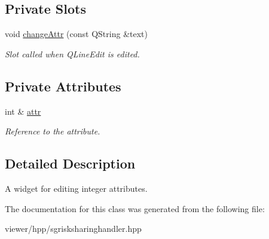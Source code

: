 \subsection*{Private Slots}
\begin{DoxyCompactItemize}
\item 
\mbox{\label{classSGIntAttrEdit_a2a8918c9b08a451d63779566f102391b}} 
void \hyperlink{classSGIntAttrEdit_a2a8918c9b08a451d63779566f102391b}{change\+Attr} (const Q\+String \&text)
\begin{DoxyCompactList}\small\item\em Slot called when Q\+Line\+Edit is edited. \end{DoxyCompactList}\end{DoxyCompactItemize}
\subsection*{Private Attributes}
\begin{DoxyCompactItemize}
\item 
\mbox{\label{classSGIntAttrEdit_ac7a5de9b8735b5f0d1f39759c833fd4f}} 
int \& \hyperlink{classSGIntAttrEdit_ac7a5de9b8735b5f0d1f39759c833fd4f}{attr}
\begin{DoxyCompactList}\small\item\em Reference to the attribute. \end{DoxyCompactList}\end{DoxyCompactItemize}


\subsection{Detailed Description}
A widget for editing integer attributes. 

The documentation for this class was generated from the following file\+:\begin{DoxyCompactItemize}
\item 
viewer/hpp/sgrisksharinghandler.\+hpp\end{DoxyCompactItemize}
